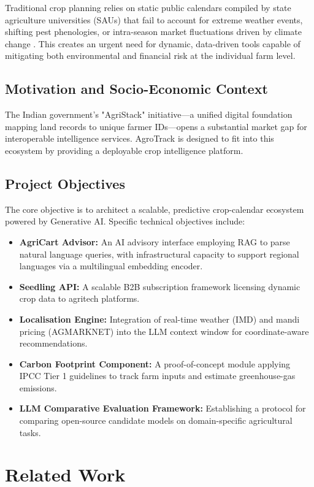 \documentclass[10pt,twocolumn,letterpaper]{article}
\begin{document}
Traditional crop planning relies on static public calendars compiled by state agriculture universities (SAUs) that fail to account for extreme weather events, shifting pest phenologies, or intra-season market fluctuations driven by climate change \cite{Lewis_2020}. This creates an urgent need for dynamic, data-driven tools capable of mitigating both environmental and financial risk at the individual farm level.

\subsection{Motivation and Socio-Economic Context}
The Indian government's "AgriStack" initiative---a unified digital foundation mapping land records to unique farmer IDs---opens a substantial market gap for interoperable intelligence services. AgroTrack is designed to fit into this ecosystem by providing a deployable crop intelligence platform.

\subsection{Project Objectives}
The core objective is to architect a scalable, predictive crop-calendar ecosystem powered by Generative AI. Specific technical objectives include:
\begin{itemize}
    \item \textbf{AgriCart Advisor:} An AI advisory interface employing RAG to parse natural language queries, with infrastructural capacity to support regional languages via a multilingual embedding encoder.
    \item \textbf{Seedling API:} A scalable B2B subscription framework licensing dynamic crop data to agritech platforms.
    \item \textbf{Localisation Engine:} Integration of real-time weather (IMD) and mandi pricing (AGMARKNET) into the LLM context window for coordinate-aware recommendations.
    \item \textbf{Carbon Footprint Component:} A proof-of-concept module applying IPCC Tier 1 guidelines to track farm inputs and estimate greenhouse-gas emissions.
    \item \textbf{LLM Comparative Evaluation Framework:} Establishing a protocol for comparing open-source candidate models on domain-specific agricultural tasks.
\end{itemize}

\section{Related Work}
\end{document}
